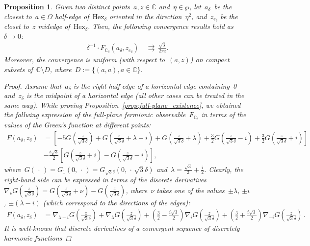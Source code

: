 \documentclass[reqno,11pt,a4paper]{amsart}
\newtheorem{proposition}{Proposition}[section]
\theoremstyle{remark}
\newcommand{\C}{\mathbb{C}}
\newcommand{\Hex}{\mathrm{Hex}}
\begin{document}
\begin{proposition}
\label{prop:full-plane_convergence}
Given two distinct points~$a,z\in\C$ and~$\eta\in\wp$,
let~$a_\delta$~be the closest to~$a\in\Omega$ half-edge of~$\Hex_\delta$ oriented in the direction~$\eta^2$,
and~$z_{e_\delta}$ be the closet to~$z$ midedge of~$\Hex_\delta$.
Then, the following convergence results hold as~$\delta\to 0$:
\begin{align*}
\delta^{-1}\cdot F_{\C_\delta}(a_\delta,z_{e_\delta})&\ \rightrightarrows\ \tfrac{\sqrt{3}}{2\pi z}.
\end{align*}
Moreover, the convergence is uniform (with respect to~$(a,z)$) on compact subsets
of~$\C\setminus D$, where~$D:=\{(a,a),a\in\C\}$.

\begin{proof}
Assume that~$a_\delta$ is the right half-edge of a horizontal edge containing~0
and~$z_\delta$ is the midpoint of a horizontal edge
(all other cases can be treated in the same way).
While proving Proposition~\ref{prop:full-plane_existence}, we obtained the follwing expression of
the full-plane fermionic observable~$F_{\C_\delta}$
in terms of the values of the Green's function at different points:
\begin{align*}
F(a_\delta,z_\delta) &=
\left[ -5G(\tfrac{z}{\sqrt{3}\delta}) + G(\tfrac{z}{\sqrt{3}\delta}+\lambda - i) + G(\tfrac{z}{\sqrt{3}\delta}+\lambda) + \tfrac{3}{2}G(\tfrac{z}{\sqrt{3}\delta}-i)
+ \tfrac{3}{2}G(\tfrac{z}{\sqrt{3}\delta}+i) \right]\\
&-\tfrac{i\sqrt{3}}{2}\left[ G(\tfrac{z}{\sqrt{3}\delta}+i) - G(\tfrac{z}{\sqrt{3}\delta}-i)\right],
\end{align*}
where~$G(\,\cdot\,) =G_{1}(0,\,\cdot\,)= G_{\sqrt{3}\delta}(0,\,\cdot\,\sqrt{3}\delta)$
and~$\lambda = \tfrac{\sqrt{3}}{2} + \tfrac{i}{2}$.
Clearly, the right-hand side can be expressed in terms of the discrete
derivatives~$\nabla_\nu G(\tfrac{z}{\sqrt{3}\delta}) = G(\tfrac{z}{\sqrt{3}\delta} + \nu) - G(\tfrac{z}{\sqrt{3}\delta})$,
where~$\nu$ takes one of the values~$\pm\lambda$, $\pm i$, $\pm(\lambda - i)$
(which correspond to the directions of the edges):
\begin{align*}
F(a_\delta,z_\delta) &=
\nabla_{\lambda - i} G(\tfrac{z}{\sqrt{3}\delta})
+\nabla_{\lambda} G(\tfrac{z}{\sqrt{3}\delta})
+\left(\tfrac{3}{2} - \tfrac{i\sqrt{3}}{2}\right) \nabla_{i} G(\tfrac{z}{\sqrt{3}\delta})
+\left(\tfrac{3}{2} + \tfrac{i\sqrt{3}}{2}\right) \nabla_{-i} G(\tfrac{z}{\sqrt{3}\delta})\,.
\end{align*}
It is well-known that discrete derivatives of a convergent sequence of discretely harmonic functions

\end{proof}
\end{proposition}
\end{document}
